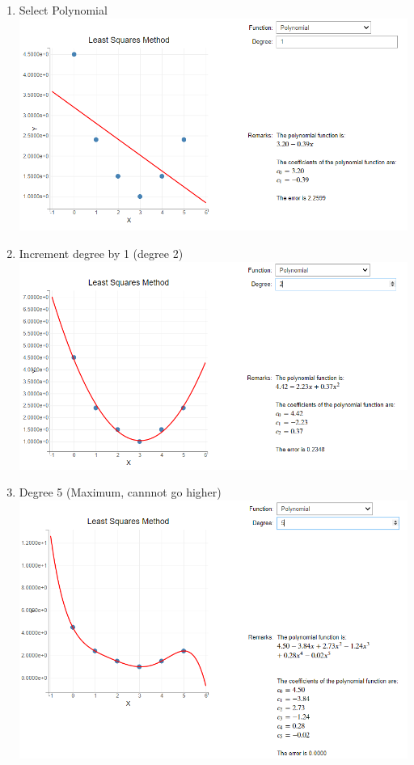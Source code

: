 {\begin{enumerate}
    \item Select Polynomial\\
    \includegraphics[scale=0.7]{Include/Images/Thesis/Documentation/Visualizers/LeastSquares/Example 1/Example 1 - 00 - Polinomial .png}
    \item Increment degree by 1 (degree 2)\\
    \includegraphics[scale=0.7]{Include/Images/Thesis/Documentation/Visualizers/LeastSquares/Example 1/Example 1 - 01 - Polinomial Degree 2.png}
    \item Degree 5 (Maximum, cannnot go higher)\\
    \includegraphics[scale=0.7]{Include/Images/Thesis/Documentation/Visualizers/LeastSquares/Example 1/Example 1 - 02 - Polinomial Degree 5.png}

\end{enumerate}
}

